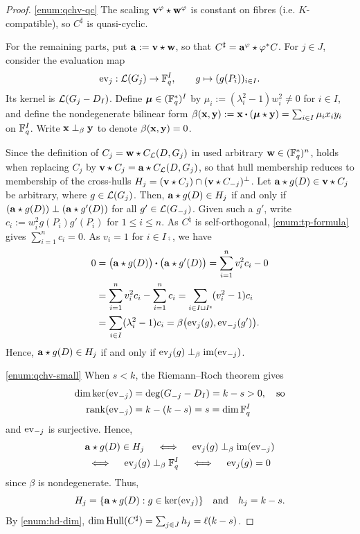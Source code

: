 \documentclass[twocolumn, 11pt]{scrartcl}
\begin{document}
\begin{proof}
    \ref{enum:qchv-qc} The scaling $\mathbf{v}^\varphi\star\mathbf{w}^\varphi$ is constant on fibres (i.e. $K$-compatible), so $C^\sharp$ is quasi-cyclic.

    For the remaining parts, put $\mathbf{a}:=\mathbf{v}\star\mathbf{w}$, so that $C^\sharp=\mathbf{a}^\varphi\star\varphi^*C$. For $j\in J$, consider the evaluation map
    \[ \operatorname{ev}_j:\mathcal{L}(G_j)\to\mathbb{F}_q^I,\qquad g\mapsto(g(P_i))_{i\in I}. \]
    Its kernel is $\mathcal{L}(G_j-D_I)$. Define $\boldsymbol\mu\in(\mathbb{F}_q^*)^I$ by $\mu_i:=(\lambda_i^2-1)w_i^2\neq0$ for $i\in I$, and define the nondegenerate bilinear form $\beta(\bfx,\bfy):=\bfx\dotpr(\bm\mu\star\bfy)=\sum_{i\in I}\mu_ix_iy_i$ on $\mathbb{F}_q^I$. Write $\mathbf{x}\perp_\beta\mathbf{y}$ to denote $\beta(\mathbf{x},\mathbf{y})=0$.

    Since the definition of $C_j=\mathbf{w}\star C_\mathcal{L}(D,G_j)$ in  used arbitrary $\mathbf{w}\in(\mathbb{F}_q^*)^n$,  holds when replacing $C_j$ by $\mathbf{v}\star C_j=\mathbf{a}\star C_\mathcal{L}(D,G_j)$, so that hull membership reduces to membership of the cross-hulls $H_j=(\mathbf{v}\star C_j)\cap(\mathbf{v}\star C_{-j})^\perp$. Let $\mathbf{a}\star g(D)\in\mathbf{v}\star C_j$ be arbitrary, where $g\in\mathcal{L}(G_j)$. Then, $\mathbf{a}\star g(D)\in H_j$ if and only if $(\mathbf{a}\star g(D))\perp(\mathbf{a}\star g'(D))$ for all $g'\in\mathcal{L}(G_{-j})$. Given such a $g'$, write $c_i:=w_i^2 g(P_i)g'(P_i)$ for $1\leq i\leq n$. As $C^\natural$ is self-orthogonal, \ref{enum:tp-formula} gives $\sum_{i=1}^n c_i=0$. As $v_i=1$ for $i\in I\comp$, we have
    \begin{align*}
        0&=\pa[\big]{\bfa\star g(D)}\dotpr\pa[\big]{\bfa\star g'(D)}=\sum_{i=1}^n v_i^2 c_i-0 \\
        &=\sum_{i=1}^n v_i^2 c_i-\sum_{i=1}^n c_i=\sum_{i\in I\sqcup I\comp} (v_i^2-1) c_i \\
        &=\sum_{i\in I} (\lambda_i^2-1) c_i= \beta\pa[\big]{\ev_j(g),\ev_{-j}(g')}.
    \end{align*}
    Hence, $\mathbf{a}\star g(D)\in H_j$ if and only if $\operatorname{ev}_j(g)\perp_\beta\operatorname{im}(\operatorname{ev}_{-j})$.

    \ref{enum:qchv-small} When $s<k$, the Riemann--Roch theorem gives
    \begin{align*}
        \dim\ker(\operatorname{ev}_{-j})&=\deg(G_{-j}-D_I)=k-s>0,\quad\text{so} \\
        \operatorname{rank}(\operatorname{ev}_{-j})&=k-(k-s)=s=\dim\mathbb{F}_q^I
    \end{align*}
    and $\operatorname{ev}_{-j}$ is surjective. Hence,
    \begin{gather*}
        \mathbf{a}\star g(D)\in H_j \quad\iff\quad \operatorname{ev}_j(g) \perp_\beta \operatorname{im}(\operatorname{ev}_{-j}) \\
        \iff\quad \operatorname{ev}_j(g) \perp_\beta \mathbb{F}_q^I 
        \quad\iff\quad \operatorname{ev}_j(g)=0
    \end{gather*}
    since $\beta$ is nondegenerate. Thus,
    \[ H_j=\{\mathbf{a}\star g(D):g\in\ker(\operatorname{ev}_j)\}\quad\text{and}\quad h_j=k-s.\]
    By \ref{enum:hd-dim}, $\dim\operatorname{Hull}(C^\sharp)=\sum_{j\in J}h_j=\ell(k-s)$.


\end{proof}
\end{document}
